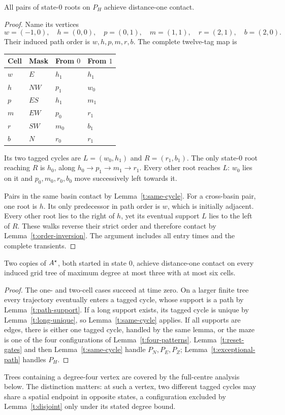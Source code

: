 \begin{lemma}\label{t:exceptional-path}
All pairs of state-\(0\) roots on \(P_H\) achieve distance-one contact.
\end{lemma}
\begin{proof}
Name its vertices
\[
 w=(-1,0),\quad h=(0,0),\quad p=(0,1),\quad
 m=(1,1),\quad r=(2,1),\quad b=(2,0).
\]
Their induced path order is \(w,h,p,m,r,b\).
The complete twelve-tag map is
\begin{center}
\small
\begin{tabular}{@{}llll@{}}
\toprule
Cell & Mask & From \(0\) & From \(1\)\\
\midrule
\(w\) & \(E\) & \(h_1\) & \(h_1\)\\
\(h\) & \(NW\) & \(p_1\) & \(w_0\)\\
\(p\) & \(ES\) & \(h_1\) & \(m_1\)\\
\(m\) & \(EW\) & \(p_0\) & \(r_1\)\\
\(r\) & \(SW\) & \(m_0\) & \(b_1\)\\
\(b\) & \(N\) & \(r_0\) & \(r_1\)\\
\bottomrule
\end{tabular}
\end{center}
Its two tagged cycles are \(L=(w_0,h_1)\) and \(R=(r_1,b_1)\).
The only state-\(0\) root reaching \(R\) is \(h_0\), along
\(h_0\to p_1\to m_1\to r_1\). Every other root reaches \(L\):
\(w_0\) lies on it and \(p_0,m_0,r_0,b_0\) move successively
left towards it.

Pairs in the same basin contact by Lemma~\ref{t:same-cycle}.
For a cross-basin pair, one root is \(h\). Its only predecessor
in path order is \(w\), which is initially adjacent. Every other
root lies to the right of \(h\), yet its eventual support \(L\)
lies to the left of \(R\). These walks reverse their strict order
and therefore contact by Lemma~\ref{t:order-inversion}.
The argument includes all entry times and the complete transients.
\end{proof}



\begin{samepage}
\begin{proposition}\label{t:small-trees}
Two copies of \(A^{\star}\), both started in state \(0\), achieve
distance-one contact on every induced grid tree of maximum degree
at most three with at most six cells.
\end{proposition}
\begin{proof}
The one- and two-cell cases succeed at time zero. On a larger
finite tree every trajectory eventually enters a tagged cycle,
whose support is a path by Lemma~\ref{t:path-support}.
If a long support exists, its tagged cycle is unique by
Lemma~\ref{t:long-unique}, so Lemma~\ref{t:same-cycle} applies.
If all supports are edges, there is either one tagged cycle,
handled by the same lemma, or the maze is one of the four
configurations of Lemma~\ref{t:four-patterns}.
Lemma~\ref{t:reset-gates} and then Lemma~\ref{t:same-cycle}
handle \(P_N,P_E,P_Z\); Lemma~\ref{t:exceptional-path}
handles \(P_H\).
\end{proof}
\end{samepage}

Trees containing a degree-four vertex are covered by the full-centre
analysis below. The distinction matters: at such a vertex, two
different tagged cycles may share a spatial endpoint in opposite
states, a configuration excluded by Lemma~\ref{t:disjoint} only under
its stated degree bound.
